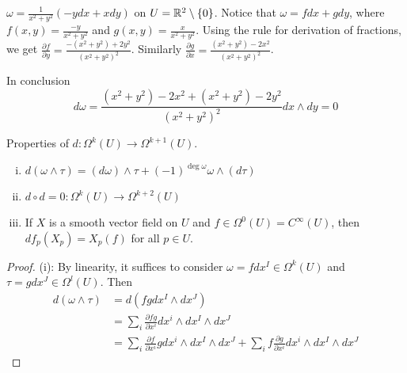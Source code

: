 \begin{frame}
  \begin{example}
    $\omega = \frac{1}{x^2 + y^2}(-ydx + xdy)$ on $U = \mathbb R^2 \setminus \{0\}$.
    Notice that
    $\omega = fdx + gdy$, where $f(x,y) =
    \frac{-y}{x^2 + y^2}$ and
    $g(x, y) = 
    \frac{x}{x^2 + y^2}$.
    Using the rule for derivation of fractions, we get
    $\frac{\partial f}{\partial y} = \frac{-(x^2 + y^2) + 2y^2}{(x^2 +
    y^2)^2}$.
    Similarly 
    $\frac{\partial g}{\partial x} = \frac{(x^2 + y^2) - 2x^2}{(x^2 +
    y^2)^2}$.

    In conclusion
    \begin{displaymath}
      d\omega = \frac{(x^2 + y^2) - 2x^2 +(x^2 + y^2) - 2y^2}{(x^2 + y^2)^2}
      dx \wedge dy
      = 0
    \end{displaymath}
  \end{example}
\end{frame}
\begin{frame}
  \begin{prop}
    Properties of $d \colon \Omega^k(U) \to \Omega^{k+1}(U)$.
    \begin{enumerate}[(i)]
      \item $d(\omega \wedge \tau) = (d\omega) \wedge \tau + (-1)^{\deg \omega}
        \omega \wedge (d \tau)$
      \item $d \circ d = 0 \colon \Omega^k(U) \to \Omega^{k+2}(U)$
      \item If $X$ is a smooth vector field on $U$ and $f \in \Omega^0(U) =
        C^{\infty}(U)$, then $df_p(X_p) = X_p(f)$ for all $p \in U$.
    \end{enumerate}
  \end{prop}
  \begin{proof}
    (i): By linearity, it suffices to consider $\omega = fdx^I \in \Omega^k(U)$ and 
    $\tau = gdx^J \in \Omega^l(U)$.
    Then
    \begin{align*}
      d(\omega \wedge \tau) &=
      d(fg dx^I \wedge dx^J) \\
      &=
      \sum_i \frac{\partial fg}{\partial x^i} 
      dx^i \wedge
      dx^I \wedge dx^J \\
      &=
      \sum_i \frac{\partial f}{\partial x^i}g 
      dx^i \wedge
      dx^I \wedge  dx^J +
      \sum_i f \frac{\partial g}{\partial x^i} 
      dx^i \wedge
      dx^I \wedge dx^J 
    \end{align*}
  \end{proof}
\end{frame}

